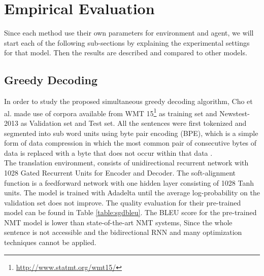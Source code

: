 \documentclass{sfuthesis}
\begin{document}
\section{Empirical Evaluation}
Since each method use their own parameters for environment and agent, we will start each of the following sub-sections by explaining the experimental settings for that model. Then the results are described and compared to other models.
\subsection{Greedy Decoding}
In order to study the proposed simultaneous greedy decoding algorithm, Cho et al. made use of corpora available from WMT 15\footnote{\url{http://www.statmt.org/wmt15/}} as training set and Newstest-2013 as Validation set and Test set. All the sentences were first tokenized and segmented into sub word units using byte pair encoding (BPE), which is a simple form of data compression in which the most common pair of consecutive bytes of data is replaced with a byte that does not occur within that data \cite{Gage:1994:Cusers}.
\\
The translation environment, consists of unidirectional recurrent network with 1028 Gated Recurrent Units for Encoder and Decoder. The soft-alignment function is a feedforward network with one hidden layer consisting of 1028 Tanh units. The model is trained with Adadelta \cite{zeiler:2012:arxive} until the average log-probability on the validation set does not improve. The quality evaluation for their pre-trained model can be found in Table \ref{table:sgdbleu}. The BLEU score for the pre-trained NMT model is lower than state-of-the-art NMT systems, Since the whole sentence is not accessible and the bidirectional RNN and many optimization techniques cannot be applied.
\end{document}
